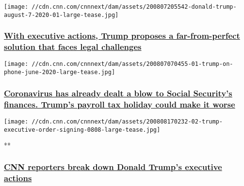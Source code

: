 \texttt{[image: //cdn.cnn.com/cnnnext/dam/assets/200807205542-donald-trump-august-7-2020-01-large-tease.jpg]}

\hypertarget{with-executive-actions-trump-proposes-a-far-from-perfect-solution-that-faces-legal-challenges}{%
\subsubsection{\texorpdfstring{\href{/2020/08/08/politics/trump-democrats-stimulus-talks-stalled/index.html}{With
executive actions, Trump proposes a far-from-perfect solution that faces
legal
challenges}}{With executive actions, Trump proposes a far-from-perfect solution that faces legal challenges}}\label{with-executive-actions-trump-proposes-a-far-from-perfect-solution-that-faces-legal-challenges}}

\href{/2020/08/07/politics/social-security-medicare-trump-payroll-taxes/index.html}{}

\texttt{[image: //cdn.cnn.com/cnnnext/dam/assets/200807070455-01-trump-on-phone-june-2020-large-tease.jpg]}

\hypertarget{coronavirus-has-already-dealt-a-blow-to-social-securitys-finances-trumps-payroll-tax-holiday-could-make-it-worse}{%
\subsubsection{\texorpdfstring{\href{/2020/08/07/politics/social-security-medicare-trump-payroll-taxes/index.html}{Coronavirus
has already dealt a blow to Social Security's finances. Trump's payroll
tax holiday could make it
worse}}{Coronavirus has already dealt a blow to Social Security's finances. Trump's payroll tax holiday could make it worse}}\label{coronavirus-has-already-dealt-a-blow-to-social-securitys-finances-trumps-payroll-tax-holiday-could-make-it-worse}}

\href{/videos/politics/2020/08/08/trump-signs-executive-actions-unemployment-stimulus-holmes-dale-nr-vpx.cnn}{}

\texttt{[image: //cdn.cnn.com/cnnnext/dam/assets/200808170232-02-trump-executive-order-signing-0808-large-tease.jpg]}

**

\hypertarget{cnn-reporters-break-down-donald-trumps-executive-actions}{%
\subsubsection{\texorpdfstring{\href{/videos/politics/2020/08/08/trump-signs-executive-actions-unemployment-stimulus-holmes-dale-nr-vpx.cnn}{CNN
reporters break down Donald Trump's executive
actions}}{CNN reporters break down Donald Trump's executive actions}}\label{cnn-reporters-break-down-donald-trumps-executive-actions}}

